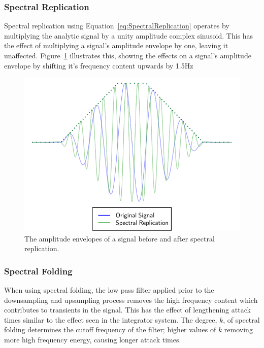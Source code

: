 		\subsubsection*{Spectral Replication}
			Spectral replication using Equation~\ref{eq:SpectralReplication} operates by multiplying the
			analytic signal by a unity amplitude complex sinusoid. This has the effect of multiplying a
			signal's amplitude envelope by one, leaving it unaffected.
			Figure~\ref{fig:SpectralReplicationTemporalEffects} illustrates this, showing the effects on a
			signal's amplitude envelope by shifting it's frequency content upwards by 1.5Hz

			\begin{figure}[h!]
				\centering
				\includegraphics{chapter5/Images/SpectralReplicationTemporalEffects.pdf}
				\caption{The amplitude envelopes of a signal before and after spectral replication.}
				\label{fig:SpectralReplicationTemporalEffects}
			\end{figure}

		\subsubsection*{Spectral Folding}
			When using spectral folding, the low pass filter applied prior to the downsampling and upsampling
			process removes the high frequency content which contributes to transients in the signal. This has
			the effect of lengthening attack times similar to the effect seen in the integrator system. The
			degree, $k$, of spectral folding determines the cutoff frequency of the filter; higher values of
			$k$ removing more high frequency energy, causing longer attack times.

